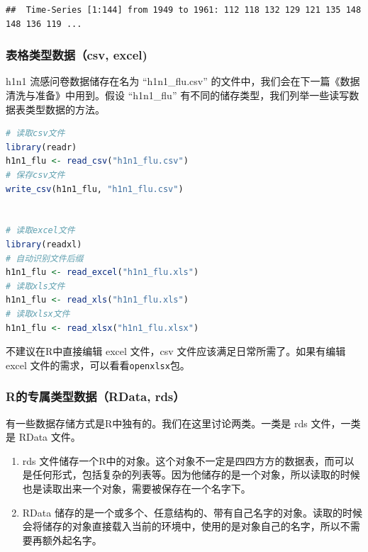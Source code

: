 \documentclass[]{ctexbook}
\providecommand{\tightlist}{%
  \setlength{\itemsep}{0pt}\setlength{\parskip}{0pt}}
\newcommand{\passthrough}[1]{#1}
\begin{document}
\begin{lstlisting}
##  Time-Series [1:144] from 1949 to 1961: 112 118 132 129 121 135 148 148 136 119 ...
\end{lstlisting}

\hypertarget{ux8868ux683cux7c7bux578bux6570ux636ecsv-excel}{%
\subsubsection{表格类型数据（csv, excel)}\label{ux8868ux683cux7c7bux578bux6570ux636ecsv-excel}}

h1n1 流感问卷数据储存在名为 ``h1n1\_flu.csv'' 的文件中，我们会在下一篇《数据清洗与准备》中用到。假设 ``h1n1\_flu'' 有不同的储存类型，我们列举一些读写数据表类型数据的方法。

\begin{lstlisting}[language=R]
# 读取csv文件
library(readr)
h1n1_flu <- read_csv("h1n1_flu.csv")
# 保存csv文件
write_csv(h1n1_flu, "h1n1_flu.csv")


# 读取excel文件
library(readxl)
# 自动识别文件后缀
h1n1_flu <- read_excel("h1n1_flu.xls")
# 读取xls文件
h1n1_flu <- read_xls("h1n1_flu.xls")
# 读取xlsx文件
h1n1_flu <- read_xlsx("h1n1_flu.xlsx")
\end{lstlisting}

不建议在R中直接编辑 excel 文件，csv 文件应该满足日常所需了。如果有编辑 excel 文件的需求，可以看看\passthrough{\lstinline!openxlsx!}包。

\hypertarget{rux7684ux4e13ux5c5eux7c7bux578bux6570ux636erdata-rds}{%
\subsubsection{R的专属类型数据（RData, rds）}\label{rux7684ux4e13ux5c5eux7c7bux578bux6570ux636erdata-rds}}

有一些数据存储方式是R中独有的。我们在这里讨论两类。一类是 rds 文件，一类是 RData 文件。

\begin{enumerate}
\def\labelenumi{\arabic{enumi}.}
\tightlist
\item
  rds 文件储存一个R中的对象。这个对象不一定是四四方方的数据表，而可以是任何形式，包括复杂的列表等。因为他储存的是一个对象，所以读取的时候也是读取出来一个对象，需要被保存在一个名字下。
\item
  RData 储存的是一个或多个、任意结构的、带有自己名字的对象。读取的时候会将储存的对象直接载入当前的环境中，使用的是对象自己的名字，所以不需要再额外起名字。
\end{enumerate}
\end{document}
